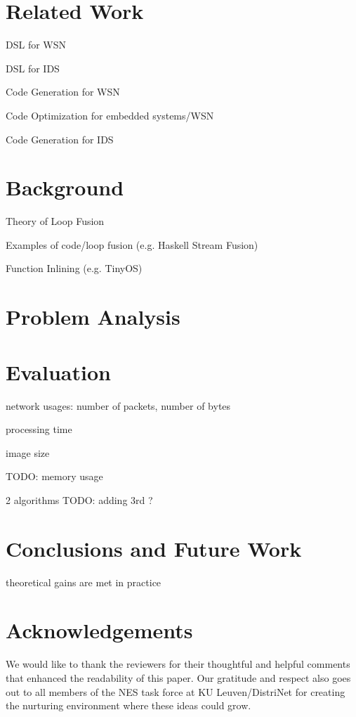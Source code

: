 \documentclass[conference]{IEEEtran}
\begin{document}
\section{Related Work}

DSL for WSN

DSL for IDS

Code Generation for WSN

Code Optimization for embedded systems/WSN

Code Generation for IDS

\section{Background}

Theory of Loop Fusion

Examples of code/loop fusion (e.g. Haskell Stream Fusion)

Function Inlining (e.g. TinyOS)

\section{Problem Analysis}



\section{Evaluation}

network usages: number of packets, number of bytes

processing time

image size

TODO: memory usage

2 algorithms
TODO: adding 3rd ?

\section{Conclusions and Future Work}

theoretical gains are met in practice



\section*{Acknowledgements}

We would like to thank the reviewers for their thoughtful and helpful comments
that enhanced the readability of this paper. Our gratitude and respect also
goes out to all members of the NES task force at KU Leuven/DistriNet for
creating the nurturing environment where these ideas could grow.

% 
% 
\end{document}
